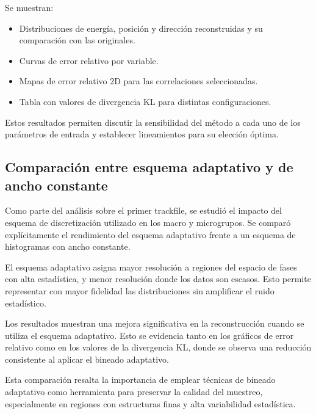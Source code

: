 Se muestran:

\begin{itemize}
    \item Distribuciones de energía, posición y dirección reconstruidas y su comparación con las originales.
    \item Curvas de error relativo por variable.
    \item Mapas de error relativo 2D para las correlaciones seleccionadas.
    \item Tabla con valores de divergencia KL para distintas configuraciones.
\end{itemize}

Estos resultados permiten discutir la sensibilidad del método a cada uno de los parámetros de entrada y establecer lineamientos para su elección óptima.

\subsection{Comparación entre esquema adaptativo y de ancho constante}
\label{subsec:adaptativo-vs-constante}

Como parte del análisis sobre el primer trackfile, se estudió el impacto del esquema de discretización utilizado en los macro y microgrupos. Se comparó explícitamente el rendimiento del esquema adaptativo frente a un esquema de histogramas con ancho constante.

El esquema adaptativo asigna mayor resolución a regiones del espacio de fases con alta estadística, y menor resolución donde los datos son escasos. Esto permite representar con mayor fidelidad las distribuciones sin amplificar el ruido estadístico.

Los resultados muestran una mejora significativa en la reconstrucción cuando se utiliza el esquema adaptativo. Esto se evidencia tanto en los gráficos de error relativo como en los valores de la divergencia KL, donde se observa una reducción consistente al aplicar el bineado adaptativo.


Esta comparación resalta la importancia de emplear técnicas de bineado adaptativo como herramienta para preservar la calidad del muestreo, especialmente en regiones con estructuras finas y alta variabilidad estadística.

